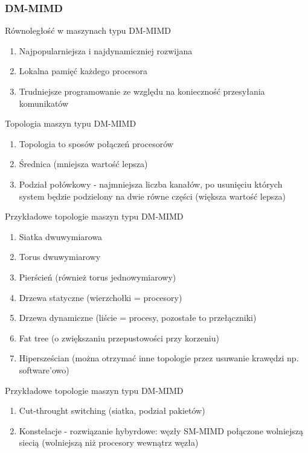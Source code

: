 \documentclass{beamer}
\begin{document}
\subsubsection{DM-MIMD}

\begin{frame}{Równoległość w maszynach typu DM-MIMD}
  \begin{enumerate}
  \item Najpopularniejsza i najdynamiczniej rozwijana
  \item Lokalna pamięć każdego procesora
  \item Trudniejsze programowanie ze względu na konieczność przesyłania komunikatów
  \end{enumerate}
\end{frame}

\begin{frame}{Topologia maszyn typu DM-MIMD}
  \begin{enumerate}
  \item Topologia to sposów połączeń procesorów
  \item Średnica (mniejsza wartość lepsza)
  \item Podział połówkowy - najmniejsza liczba kanałów, po usunięciu których system będzie podzielony na dwie równe części (większa wartość lepsza)
  \end{enumerate}
\end{frame}

\begin{frame}{Przykładowe topologie maszyn typu DM-MIMD}
  \begin{enumerate}
  \item Siatka dwuwymiarowa
  \item Torus dwuwymiarowy
  \item Pierścień (również torus jednowymiarowy)
  \item Drzewa statyczne (wierzchołki = procesory)
  \item Drzewa dynamiczne (liście = procesy, pozostałe to przełączniki)
  \item Fat tree (o zwiększaniu przepustowości przy korzeniu)
  \item Hipersześcian (można otrzymać inne topologie przez usuwanie krawędzi np. software'owo)
  \end{enumerate}
\end{frame}

\begin{frame}{Przykładowe topologie maszyn typu DM-MIMD}
  \begin{enumerate}
  \item Cut-throught switching (siatka, podział pakietów)
  \item Konstelacje - rozwiązanie hybyrdowe: węzły SM-MIMD połączone wolniejszą siecią (wolniejszą niż procesory wewnątrz węzła)
  \end{enumerate}
\end{frame}
\end{document}
